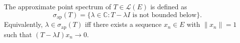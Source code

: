 The approximate point spectrum of $T \in \mathcal{L}(E)$ is defined as
$$\sigma_{\text{ap}}(T) = \{\lambda \in \mathbb{C} : T - \lambda I \text{ is not bounded below}\}.$$
Equivalently, $\lambda \in \sigma_{\text{ap}}(T)$ iff there exists a sequence $x_n \in E$ with $\|x_n\| = 1$ such that $(T - \lambda I)x_n \to 0$.
